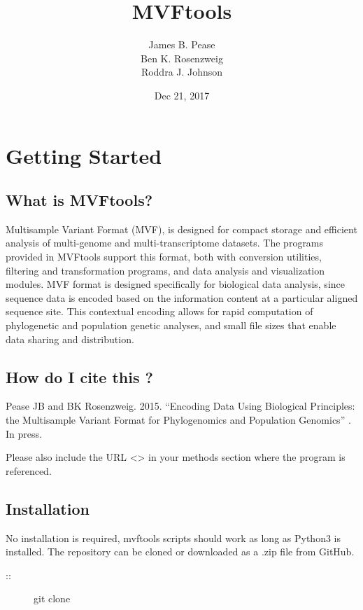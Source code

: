 \documentclass[letterpaper,11pt,english]{sphinxmanual}
\title{MVFtools}
\date{Dec 21, 2017}
\author{James B. Pease\\Ben K. Rosenzweig\\Roddra J. Johnson}
\begin{document}
\maketitle
\sphinxtableofcontents
{}\label{\detokenize{index::doc}}



\chapter{Getting Started}
\label{\detokenize{intro:getting-started}}\label{\detokenize{intro:intro}}\label{\detokenize{intro::doc}}\label{\detokenize{intro:welcome-to-mvftools-s-documentation}}

\section{What is MVFtools?}
\label{\detokenize{intro:what-is-mvftools}}
Multisample Variant Format (MVF), is designed for compact storage and efficient analysis of multi-genome and multi-transcriptome datasets.  The programs provided in MVFtools support this format, both with conversion utilities, filtering and transformation programs, and data analysis and visualization modules.  MVF format is designed specifically for biological data analysis, since sequence data is encoded based on the information content at a particular aligned sequence site.  This contextual encoding allows for rapid computation of phylogenetic and population genetic analyses, and small file sizes that enable data sharing and distribution.


\section{How do I cite this ?}
\label{\detokenize{intro:how-do-i-cite-this}}
Pease JB and BK Rosenzweig. 2015. “Encoding Data Using Biological Principles: the Multisample Variant Format for Phylogenomics and Population Genomics” . In press. 

Please also include the URL \textless{}\textgreater{} in your methods section where the program is referenced.


\section{Installation}
\label{\detokenize{intro:installation}}
No installation is required, mvftools scripts should work as long as Python3 is installed.  The repository can be cloned or downloaded as a .zip file from GitHub.
\begin{description}
\item[{::}] \leavevmode
git clone 

\end{description}
\end{document}
